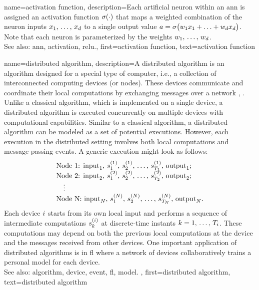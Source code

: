 {name={activation function},
	description={Each artificial neuron within an \gls{ann} is 
		assigned an \gls{activation} \gls{function} $\sigma(\cdot)$ that maps a weighted 
		combination of the neuron inputs $x_{1}, \,\ldots, \,x_{d}$ 
		to a single output value $a = \sigma\big(w_{1} x_{1}+\ldots+w_{d} x_{d} \big)$. 
		Note that each neuron is parameterized by the \gls{weights} $w_{1}, \,\ldots, \,w_{d}$.
					\\ 
		See also: \gls{ann}, \gls{activation}, \gls{relu}.},
	first={activation function},
	text={activation function} 
}

{name={distributed algorithm},
	description={A distributed \gls{algorithm} is an \gls{algorithm} designed for 
		a special type of computer, i.e., a collection of interconnected computing devices (or nodes). 
		These devices communicate and coordinate their local computations by exchanging 
		messages over a network \cite{IntroDistAlg}, \cite{ParallelDistrBook}. Unlike a classical \gls{algorithm}, 
		which is implemented on a single \gls{device}, a distributed \gls{algorithm} is 
		executed concurrently on multiple \glspl{device} with computational capabilities. 
		Similar to a classical \gls{algorithm}, a distributed \gls{algorithm} can be modeled as a 
		set of potential executions. However, each execution in the distributed setting involves 
		both local computations and message-passing \glspl{event}. A generic execution might look as 
		follows:
		\[
		\begin{array}{l}
			\text{Node 1: } {\rm input}_1, \,s_1^{(1)}, \,s_2^{(1)}, \,\ldots, \,s_{T_1}^{(1)}, \,{\rm output}_1; \\
			\text{Node 2: } {\rm input}_2, \,s_1^{(2)}, \,s_2^{(2)}, \,\ldots, \,s_{T_2}^{(2)}, \,{\rm output}_2; \\
			\quad \vdots \\
			\text{Node N: } {\rm input}_N, \,s_1^{(N)}, \,s_2^{(N)}, \,\ldots, \,s_{T_N}^{(N)}, \,{\rm output}_N.
		\end{array}
		\]
		Each \gls{device} $i$ starts from its own local input and performs a sequence of 
		intermediate computations $s_{k}^{(i)}$ at discrete-time instants $k = 1, \,\dots, \,T_i$. 
		These computations may depend on both the previous local computations at the \gls{device} 
		and the messages received from other \glspl{device}. One important application of distributed 
		\glspl{algorithm} is in \gls{fl} where a network of \glspl{device} collaboratively trains a personal \gls{model} 
		for each \gls{device}. 
					\\ 
		See also: \gls{algorithm}, \gls{device}, \gls{event}, \gls{fl}, \gls{model}.
		},
	first={distributed algorithm}, 
	text={distributed algorithm}
}


